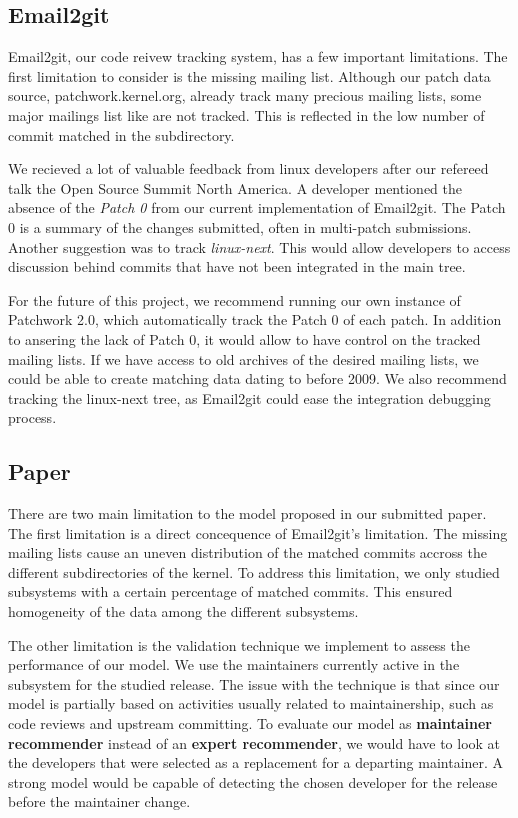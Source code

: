 \subsection{Email2git}

Email2git, our code reivew tracking system, has a few important limitations. The first limitation to consider is the missing mailing list. Although our patch data source, patchwork.kernel.org, already track many precious mailing lists, some major mailings list like  are not tracked. This is reflected in the low number of commit matched in the  subdirectory. 

We recieved a lot of valuable feedback from linux developers after our refereed talk the Open Source Summit North America. A developer mentioned the absence of the \textit{Patch 0} from our current implementation of Email2git. The Patch 0 is a summary of the changes submitted, often in multi-patch submissions. Another suggestion was to track \textit{linux-next}. This would allow developers to access discussion behind commits that have not been integrated in the main tree. 

For the future of this project, we recommend running our own instance of Patchwork 2.0, which automatically track the Patch 0 of each patch. In addition to ansering the lack of Patch 0, it would allow to have control on the tracked mailing lists. If we have access to old archives of the desired mailing lists, we could be able to create matching data dating to before 2009. We also recommend tracking the linux-next tree, as Email2git could ease the integration debugging process. 


\subsection{Paper}

There are two main limitation to the model proposed in our submitted paper. The first limitation is a direct concequence of Email2git's limitation. The missing mailing lists cause an uneven distribution of the matched commits accross the different subdirectories of the kernel. To address this limitation, we only studied subsystems with a certain percentage of matched commits. This ensured homogeneity of the data among the different subsystems. 

The other limitation is the validation technique we implement to assess the performance of our model. We use the maintainers currently active in the subsystem for the studied release. The issue with the technique is that since our model is partially based on activities usually related to maintainership, such as code reviews and upstream committing. To evaluate our model as \textbf{maintainer recommender} instead of an \textbf{expert recommender}, we would have to look at the developers that were selected as a replacement for a departing maintainer. A strong model would be capable of detecting the chosen developer for the release before the maintainer change.

